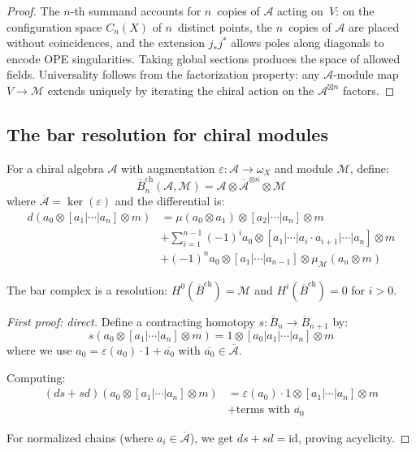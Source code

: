 \begin{proof}
The $n$-th summand accounts for $n$~copies of $\mathcal{A}$ acting
on~$V$: on the configuration space $C_n(X)$ of $n$~distinct points,
the $n$~copies of $\mathcal{A}$ are placed without coincidences, and
the extension $j_*j^*$ allows poles along diagonals to encode OPE
singularities.  Taking global sections produces the space of allowed
fields.  Universality follows from the factorization property: any
$\mathcal{A}$-module map $V \to \mathcal{M}$ extends uniquely by
iterating the chiral action on the $\mathcal{A}^{\boxtimes n}$
factors.
\end{proof}

\subsection{The bar resolution for chiral modules}

\begin{definition}
\label{def:bar-complex-modules}
For a chiral algebra $\mathcal{A}$ with augmentation $\varepsilon: \mathcal{A} \to \omega_X$ and module $\mathcal{M}$, define:
\[
\overline{B}_n^{\text{ch}}(\mathcal{A}, \mathcal{M}) = \mathcal{A} \otimes \overline{\mathcal{A}}^{\otimes n} \otimes \mathcal{M}
\]
where $\overline{\mathcal{A}} = \ker(\varepsilon)$ and the differential is:
\begin{align}
d(a_0 \otimes [a_1|\cdots|a_n] \otimes m) &= \mu(a_0 \otimes a_1) \otimes [a_2|\cdots|a_n] \otimes m \\
&+ \sum_{i=1}^{n-1} (-1)^i a_0 \otimes [a_1|\cdots|a_i \cdot a_{i+1}|\cdots|a_n] \otimes m \\
&+ (-1)^n a_0 \otimes [a_1|\cdots|a_{n-1}] \otimes \mu_{\mathcal{M}}(a_n \otimes m)
\end{align}
\end{definition}

\begin{theorem}\label{thm:bar-resolution-acyclic}
The bar complex is a resolution: $H^0(\overline{B}^{\text{ch}}) = \mathcal{M}$ and $H^i(\overline{B}^{\text{ch}}) = 0$ for $i > 0$.
\end{theorem}

\begin{proof}[First proof: direct]
Define a contracting homotopy $s: \overline{B}_n \to \overline{B}_{n+1}$ by:
\[
s(a_0 \otimes [a_1|\cdots|a_n] \otimes m) = 1 \otimes [a_0|a_1|\cdots|a_n] \otimes m
\]
where we use $a_0 = \varepsilon(a_0) \cdot 1 + \overline{a_0}$ with $\overline{a_0} \in \overline{\mathcal{A}}$.

Computing:
\begin{align}
(ds + sd)(a_0 \otimes [a_1|\cdots|a_n] \otimes m) &= \varepsilon(a_0) \cdot 1 \otimes [a_1|\cdots|a_n] \otimes m \\
&+ \text{terms with } \overline{a_0}
\end{align}

For normalized chains (where $a_i \in \overline{\mathcal{A}}$), we get $ds + sd = \text{id}$, proving acyclicity.
\end{proof}


